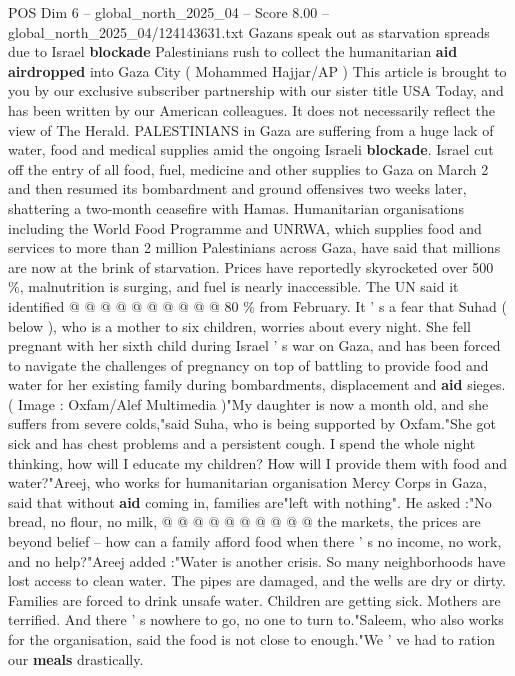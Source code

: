 \begin{textsample}{POS Dim 6 – global\_north\_2025\_04 – Score 8.00 – global\_north\_2025\_04/124143631.txt}  \label{ex:f6_pos_201}
Gazans speak out as starvation spreads due to Israel \textbf{blockade} Palestinians rush to collect the humanitarian \textbf{aid} \textbf{airdropped} into Gaza City ( Mohammed Hajjar/AP ) This article is brought to you by our exclusive subscriber partnership with our sister title USA Today, and has been written by our American colleagues.
It does not necessarily reflect the view of The Herald.
PALESTINIANS in Gaza are suffering from a huge lack of water, food and medical supplies amid the ongoing Israeli \textbf{blockade}.
Israel cut off the entry of all food, fuel, medicine and other supplies to Gaza on March 2 and then resumed its bombardment and ground offensives two weeks later, shattering a two-month ceasefire with Hamas.
Humanitarian organisations including the World Food Programme and UNRWA, which supplies food and services to more than 2 million Palestinians across Gaza, have said that millions are now at the brink of starvation.
Prices have reportedly skyrocketed over 500 \%, malnutrition is surging, and fuel is nearly inaccessible.
The UN said it identified @ @ @ @ @ @ @ @ @ @ 80 \% from February.
It ' s a fear that Suhad ( below ), who is a mother to six children, worries about every night.
She fell pregnant with her sixth child during Israel ' s war on Gaza, and has been forced to navigate the challenges of pregnancy on top of battling to provide food and water for her existing family during bombardments, displacement and \textbf{aid} sieges. ( Image : Oxfam/Alef Multimedia )"My daughter is now a month old, and she suffers from severe colds,"said Suha, who is being supported by Oxfam."She got sick and has chest problems and a persistent cough.
I spend the whole night thinking, how will I educate my children?
How will I provide them with food and water?"Areej, who works for humanitarian organisation Mercy Corps in Gaza, said that without \textbf{aid} coming in, families are"left with nothing".
He asked :"No bread, no flour, no milk, @ @ @ @ @ @ @ @ @ @ the markets, the prices are beyond belief -- how can a family afford food when there ' s no income, no work, and no help?"Areej added :"Water is another crisis.
So many neighborhoods have lost access to clean water.
The pipes are damaged, and the wells are dry or dirty.
Families are forced to drink unsafe water.
Children are getting sick.
Mothers are terrified.
And there ' s nowhere to go, no one to turn to."Saleem, who also works for the organisation, said the food is not close to enough."We ' ve had to ration our \textbf{meals} drastically.

\end{textsample}
